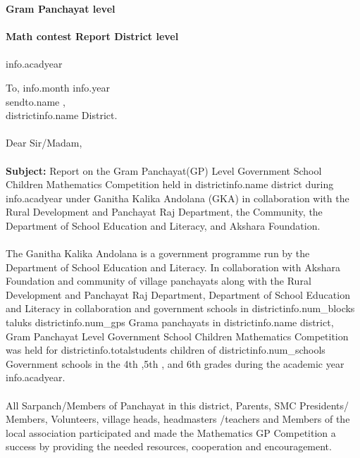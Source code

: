 \documentclass[12pt]{article}
\begin{document}
\begin{titlepage}
    \thispagestyle{title}
    \begin{center}
    \vspace*{10.5cm}
     \textbf{\huge Gram Panchayat level} \\~\\
        \textbf{\huge Math contest Report District level} \\~\\
	    \Large{{info.acadyear}}
    \end{center}
\end{titlepage}
\pagebreak

\thispagestyle{plain}
{
\setlength{\parindent}{0in}
To, \hfill  {{info.month}} {{info.year}} \\ [2ex]
{{sendto.name}} ,\\ [1ex]
{{districtinfo.name}} District.
\\~\\ [3ex]
Dear Sir/Madam,
\\~\\
\textbf{Subject:} Report on the Gram Panchayat(GP) Level Government School Children Mathematics Competition held in {{districtinfo.name}} district during {{info.acadyear}} under Ganitha Kalika Andolana (GKA) in collaboration with the Rural Development and Panchayat Raj Department, the Community, the Department of School Education and Literacy, and Akshara Foundation.
\\~\\[3ex]
The Ganitha Kalika Andolana is a government programme run by the Department of School Education and Literacy. In collaboration with Akshara Foundation and community of village panchayats along with the Rural Development and Panchayat Raj Department, Department of School Education and Literacy in collaboration and  government schools in {{districtinfo.num_blocks}} taluks {{districtinfo.num_gps}} Grama panchayats in {{districtinfo.name}} district,  Gram Panchayat Level Government School Children Mathematics Competition was held for {{districtinfo.totalstudents}} children of {{districtinfo.num_schools}} Government schools  in the 4th ,5th , and 6th  grades during the academic year {{info.acadyear}}.
\\~\\[2ex]
All Sarpanch/Members of Panchayat in this district, Parents, SMC Presidents/ Members, Volunteers, village heads, headmasters /teachers and Members of the local association participated and made the Mathematics GP Competition a success by providing the needed  resources, cooperation and encouragement.
}
\end{document}
